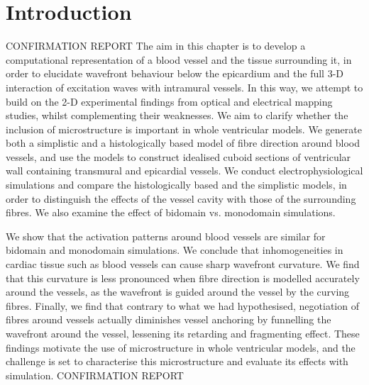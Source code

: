 
\section{Introduction}
\label{sec:review:introduction}
CONFIRMATION REPORT
The aim in this chapter is to develop a computational representation of a blood vessel and the tissue surrounding it, in order to elucidate wavefront behaviour below the epicardium and the full 3-D interaction of excitation waves with intramural vessels. In this way, we attempt to build on the 2-D experimental findings from optical and electrical mapping studies, whilst complementing their weaknesses. We aim to clarify whether the inclusion of microstructure is important in whole ventricular models. We generate both a simplistic and a histologically based model of fibre direction around blood vessels, and use the models to construct idealised cuboid sections of ventricular wall containing transmural and epicardial vessels. We conduct electrophysiological simulations and compare the histologically based and the simplistic models, in order to distinguish the effects of the vessel cavity with those of the surrounding fibres. We also examine the effect of bidomain vs. monodomain simulations.

      We show that the activation patterns around blood vessels are similar for bidomain and monodomain simulations. We conclude that inhomogeneities in cardiac tissue such as blood vessels can cause sharp wavefront curvature. We find that this curvature is less pronounced when fibre direction is modelled accurately around the vessels, as the wavefront is guided around the vessel by the curving fibres. Finally, we find that contrary to what we had hypothesised, negotiation of fibres around vessels actually diminishes vessel anchoring by funnelling the wavefront around the vessel, lessening its retarding and fragmenting effect. These findings motivate the use of microstructure in whole ventricular models, and the challenge is set to characterise this microstructure and evaluate its effects with simulation.
CONFIRMATION REPORT



